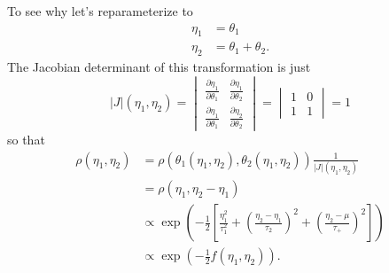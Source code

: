 \documentclass[11pt, oneside]{article}
\begin{document}
To see why let's reparameterize to
%
\begin{align*}
\eta_{1} &= \theta_{1}
\\
\eta_{2} &= \theta_{1} + \theta_{2}.
\end{align*}
%
The Jacobian determinant of this transformation is just
%
\begin{equation*}
| J | (\eta_{1}, \eta_{2})
=
\begin{vmatrix}
\frac{ \partial \eta_{1} }{ \partial \theta_{1} } & \frac{ \partial \eta_{1} }{ \partial \theta_{2} } \\
\frac{ \partial \eta_{1} }{ \partial \theta_{1} } & \frac{ \partial \eta_{2} }{ \partial \theta_{2} }
\end{vmatrix}
=
\begin{vmatrix}
1 & 0 \\
1 & 1
\end{vmatrix}
=
1
\end{equation*}
%
so that
%
\begin{align*}
\rho(\eta_{1}, \eta_{2})
&=
\rho \left( \theta_{1}(\eta_{1}, \eta_{2}), \theta_{2}(\eta_{1}, \eta_{2}) \right) \frac{1}{| J | (\eta_{1}, \eta_{2})}
\\
&= \rho \left( \eta_{1}, \eta_{2} - \eta_{1} \right)
\\
&\propto
\exp \left( - \frac{1}{2} \left[ 
\frac{ \eta_{1}^{2} }{ \tau_{1}^{2} } 
+ \left( \frac{ \eta_{2} - \eta_{1} }{ \tau_{2} } \right)^{2}
+ \left( \frac{ \eta_{2} - \mu }{\tau_{+} } \right)^{2}
\right] \right)
\\
&\propto
\exp \left( - \frac{1}{2} f(\eta_{1}, \eta_{2}) \right).
\end{align*}
\end{document}

